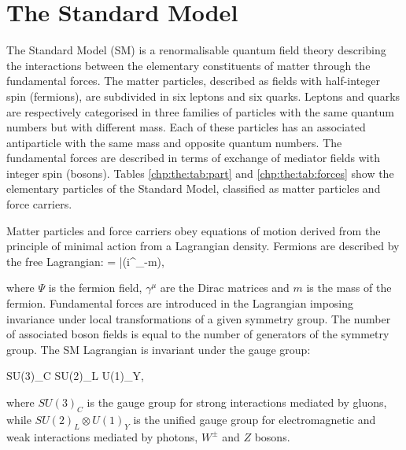 \section{The Standard Model}

The Standard Model (SM) \cite{Glashow:1961tr, Weinberg:1967tq, Salam:1980jd} is a renormalisable quantum field theory describing the interactions between the elementary constituents of matter through the fundamental forces. The matter particles, described as fields with half-integer spin (fermions), are subdivided in six leptons and six quarks. Leptons and quarks are respectively categorised in three families of particles with the same quantum numbers but with different mass. Each of these particles has an associated antiparticle with the same mass and opposite quantum numbers. 
The fundamental forces are described in terms of exchange of mediator fields with integer spin (bosons). Tables \ref{chp:the:tab:part} and \ref{chp:the:tab:forces} show the elementary particles of the Standard Model, classified as matter particles and force carriers.\par
Matter particles and force carriers obey equations of motion derived from the principle of minimal action from a Lagrangian density. Fermions are described by the free Lagrangian:
\be
{}= \bar{\Psi}(i\gamma^{\mu}\partial_{\mu}-m)\Psi,
\ee

\noindent where $\Psi$ is the fermion field, $\gamma^{\mu}$ are the Dirac matrices and $m$ is the mass of the fermion. Fundamental forces are introduced in the Lagrangian imposing invariance under local transformations  of a given symmetry group. The number of associated boson fields is equal to the number of generators of the symmetry group. The SM Lagrangian is invariant under the gauge group:

\be
SU(3)_{C} \otimes SU(2)_{L} \otimes U(1)_{Y},
\label{chp:theo:eq:gaugegroup}
\ee

\noindent where $SU(3)_{C}$ is the gauge group for strong interactions mediated by gluons, while $SU(2)_{L} \otimes U(1)_{Y}$ is the unified gauge group for electromagnetic and weak interactions mediated by photons, $W^{\pm}$ and $Z$ bosons. \\

